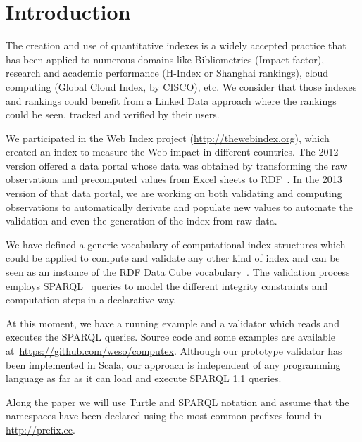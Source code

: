 \section{Introduction}

The creation and use of quantitative indexes is a widely 
accepted practice that has been applied to numerous domains like 
Bibliometrics (Impact factor), 
research and academic performance 
  (H-Index or Shanghai rankings), 
cloud computing (Global Cloud Index, by CISCO), 
etc.
We consider that those indexes and rankings could benefit from a 
 Linked Data approach where the rankings could be seen, tracked and 
 verified by their users.

We participated in the Web Index project
(\url{http://thewebindex.org}), which created an index to measure 
 the Web impact in different countries.
The 2012 version offered a data
portal whose data was obtained 
by transforming the raw observations and precomputed values 
from Excel sheets to RDF~\cite{Alvarez13}. 
In the 2013 version of that data portal, we are working on 
both validating and computing observations to automatically derivate 
and populate new values to automate the validation and even the 
generation of the index from raw data.

We have defined a generic vocabulary 
of computational index structures which could be applied to compute and validate any other kind of
index and can be seen as an instance of the RDF Data Cube
vocabulary~\cite{Cube}.
The validation process employs SPARQL~\cite{SPARQL11} queries to model the 
 different integrity constraints and computation steps in a declarative way.

At this moment, we have a running example and a validator which 
 reads and executes the SPARQL queries. 
 Source code and some examples are available
 at~\url{https://github.com/weso/computex}. 
 Although our prototype validator has been implemented in Scala, 
 our approach is independent of any programming language 
 as far as it can load and execute SPARQL 1.1 queries.

 Along the paper we will use Turtle and SPARQL notation and assume that the
namespaces have been declared using the most common prefixes found in
\url{http://prefix.cc}.
